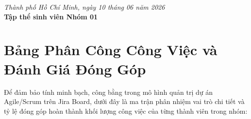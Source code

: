 \begin{flushright}
    \textit{Thành phố Hồ Chí Minh, ngày 10 tháng 06 năm 2026} \\
    \textbf{Tập thể sinh viên Nhóm 01}
\end{flushright}

\newpage

\chapter*{Bảng Phân Công Công Việc và Đánh Giá Đóng Góp}

Để đảm bảo tính minh bạch, công bằng trong mô hình quản trị dự án Agile/Scrum trên Jira Board, dưới đây là ma trận phân nhiệm vai trò chi tiết và tỷ lệ đóng góp hoàn thành khối lượng công việc của từng thành viên trong nhóm:

